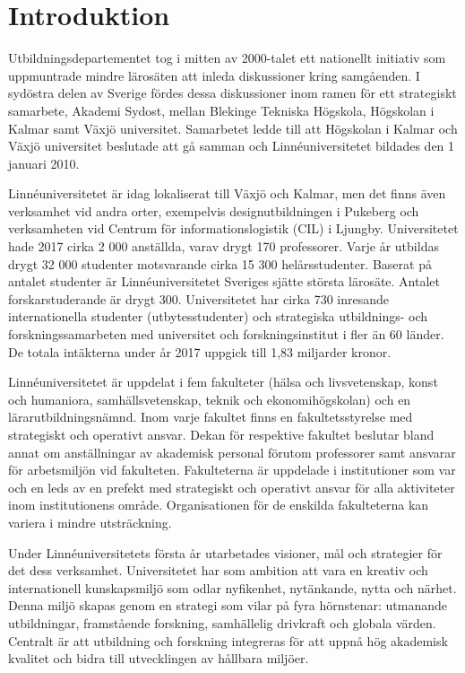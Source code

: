 \chapter{Introduktion}

Utbildningsdepartementet tog i mitten av 2000-talet ett nationellt initiativ som uppmuntrade mindre lärosäten att inleda diskussioner kring samgåenden. I sydöstra delen av Sverige fördes dessa diskussioner inom ramen för ett strategiskt samarbete, Akademi Sydost, mellan Blekinge Tekniska Högskola, Högskolan i Kalmar samt Växjö universitet. Samarbetet ledde till att Högskolan i Kalmar och Växjö universitet beslutade att gå samman och Linnéuniversitetet bildades den 1 januari 2010.

Linnéuniversitetet är idag lokaliserat till Växjö och Kalmar, men det finns även verksamhet vid andra orter, exempelvis designutbildningen i Pukeberg och verksamheten vid Centrum för informationslogistik (CIL) i Ljungby. Universitetet hade 2017 cirka 2 000 anställda, varav drygt 170 professorer. Varje år utbildas drygt 32 000 studenter motsvarande cirka 15 300 helårsstudenter. Baserat på antalet studenter är Linnéuniversitetet Sveriges sjätte största lärosäte. Antalet forskarstuderande är drygt 300. Universitetet har cirka 730 inresande internationella studenter (utbytesstudenter) och strategiska utbildnings- och forskningssamarbeten med universitet och forskningsinstitut i fler än 60 länder. De totala intäkterna under år 2017 uppgick till 1,83 miljarder kronor.

Linnéuniversitetet är uppdelat i fem fakulteter (hälsa och livsvetenskap, konst och humaniora, samhällsvetenskap, teknik och ekonomihögskolan) och en lärarutbildningsnämnd. Inom varje fakultet finns en fakultetsstyrelse med strategiskt och operativt ansvar. Dekan för respektive fakultet beslutar bland annat om anställningar av akademisk personal förutom professorer samt ansvarar för arbetsmiljön vid fakulteten. Fakulteterna är uppdelade i institutioner som var och en leds av en prefekt med strategiskt och operativt ansvar för alla aktiviteter inom institutionens område. Organisationen för de enskilda fakulteterna kan variera i mindre utsträckning.

Under Linnéuniversitetets första år utarbetades visioner, mål och strategier för det dess verksamhet. Universitetet har som ambition att vara en kreativ och internationell kunskapsmiljö som odlar nyfikenhet, nytänkande, nytta och närhet. Denna miljö skapas genom en strategi som vilar på fyra hörnstenar: utmanande utbildningar, framstående forskning, samhällelig drivkraft och globala värden. Centralt är att utbildning och forskning integreras för att uppnå hög akademisk kvalitet och bidra till utvecklingen av hållbara miljöer.

